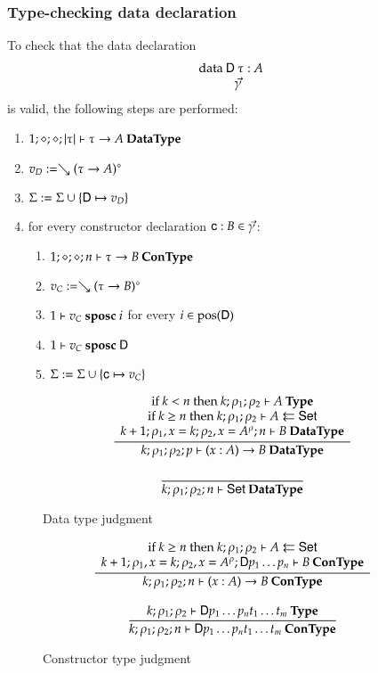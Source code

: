 \newcommand{\sposc}[3]{#1\vdash#2\mbox{ \textbf{sposc} }#3}
\newcommand{\spos}[3]{#1\vdash#2\mbox{ \textbf{spos} }#3}

\subsubsection{Type-checking data declaration}


To check that the data declaration
\[\begin{array}{l}
\data \DD \: \tau : A \\
\spcx \vec{\gamma}
\end{array}
\]
is valid, the following steps are performed: 
\begin{enumerate}
\item
$1;\diamond;\diamond;\vert\tau\vert\vdash \tau \rightarrow A\:\mathbf{Data Type}$
\item
$v_D := \searrow (\tau \rightarrow A)^{\diamond}$
\item
$\mathrm{\Sigma} := \mathrm{\Sigma} \cup \{\mathsf{D} \mapsto v_D\}$
\item
for every constructor declaration $\mathsf{c} : B  \in \vec{\gamma}$:
\begin{enumerate} 
\item
$1;\diamond;\diamond;n\vdash\tau \rightarrow B\:\mathbf{Con Type}$
\item
$v_C := \searrow (\tau \rightarrow B)^{\diamond}$
\item
$\sposc{1}{v_C}{i}$ for every $i \in \mbox{pos}(\mathsf{D}) $ 
\item
$\sposc{1}{v_C}{\DD}$
\item
$\mathrm{\Sigma} := \mathrm{\Sigma} \cup \{\mathsf{c} \mapsto v_C\}$
\end{enumerate}
\end{enumerate}

\newcommand{\nocc}[3]{#1\vdash#2\mbox{ \textbf{nocc} }#3}

\begin{figure}
\begin{gather*}
\ \dfrac{\begin{array}[b]{c}\mbox {if } k < n \mbox{ then } k;\rho_1;\rho_2\vdash A\:\mathbf{Type}\\\mbox {if } k \geq n \mbox { then } k;\rho_1;\rho_2\vdash A\leftleftarrows\mathsf{Set}\\k+1;\rho_1,x=k;\rho_2,x=A^{\rho};n\vdash B\:\mathbf{Data Type}\end{array}}{k;\rho_1;\rho_2;p\vdash( x : A ) \rightarrow{B}\:\mathbf{Data Type}}
\\[2ex]
\ \dfrac{}{k;\rho_1;\rho_2;n\vdash\mathsf{Set}\:\mathbf{Data Type}}
\end{gather*}
\caption{Data type judgment}
\end{figure}

\begin{figure}
\begin{gather*}
\ \dfrac{\begin{array}[b]{c}\mbox {if } k \geq n \mbox { then } k;\rho_1;\rho_2\vdash A\leftleftarrows\mathsf{Set}\\k+1;\rho_1,x=k;\rho_2,x=A^{\rho};\mathsf{D} p_1 \ldots p_n\vdash B\:\mathbf{Con Type}\end{array}}{k;\rho_1;\rho_2;n\vdash( x : A ) \rightarrow{B}\:\mathbf{Con Type}}
\\[2ex]
\ \dfrac{k;\rho_1;\rho_2\vdash\mathsf{D} p_1 \ldots p_n t_1 \ldots t_m\:\mathbf{Type}}{k;\rho_1;\rho_2;n\vdash\mathsf{D} p_1 \ldots p_n t_1 \ldots t_m\:\mathbf{Con Type}}
\end{gather*}
\caption{Constructor type judgment}
\end{figure}


